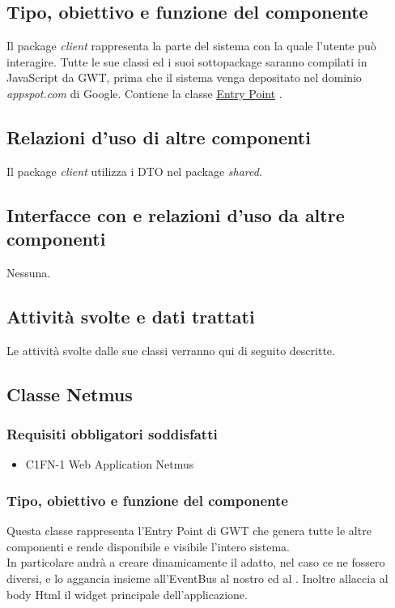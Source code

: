 \subsection*{Tipo, obiettivo e funzione del componente} %
Il package \emph{client} rappresenta la parte del sistema con la quale l'utente
pu\`o interagire. Tutte le sue classi ed i suoi sottopackage saranno compilati in
JavaScript da GWT, prima che il sistema venga depositato nel dominio
\emph{appspot.com} di Google. Contiene la classe \underline{Entry Point}
.
\subsection*{Relazioni d'uso di altre componenti}
Il package \emph{client} utilizza i DTO nel package \emph{shared}.
\subsection*{Interfacce con e relazioni d'uso da altre componenti}
Nessuna.
\subsection*{Attivit\`a svolte e dati trattati}
Le attivit\`a svolte dalle sue classi verranno qui di seguito descritte.

\subsection{Classe Netmus}
\subsubsection*{Requisiti obbligatori soddisfatti}
\begin{itemize}
	\item C1FN-1 Web Application Netmus
\end{itemize}
\subsubsection*{Tipo, obiettivo e funzione del componente}
Questa classe rappresenta l'Entry Point di GWT che genera tutte le altre
componenti e rende disponibile e visibile l'intero sistema.\\
In particolare andr\`a a creare dinamicamente il  adatto,
nel caso ce ne fossero diversi, e lo aggancia insieme all'EventBus al nostro
 ed al .
Inoltre allaccia al body Html il widget principale dell'applicazione.

